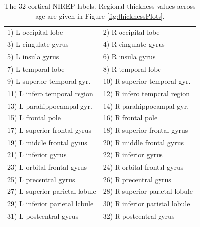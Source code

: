 \begin{table}
\centering
\begin{tabular*}{0.45\textwidth}{@{\extracolsep{\fill}} l l}
\toprule
  1) L occipital lobe & 2) R occipital lobe \\
  3) L cingulate gyrus & 4) R cingulate gyrus \\
  5) L insula gyrus & 6) R insula gyrus \\
  7) L temporal lobe & 8) R temporal lobe \\
  9) L superior temporal gyr. & 10) R superior temporal gyr. \\
  11) L infero temporal region & 12) R infero temporal region \\
  13) L parahippocampal gyr. & 14) R parahippocampal gyr. \\
  15) L frontal pole & 16) R frontal pole \\
  17) L superior frontal gyrus & 18) R superior frontal gyrus \\
  19) L middle frontal gyrus & 20) R middle frontal gyrus \\
  21) L inferior gyrus & 22) R inferior gyrus \\
  23) L orbital frontal gyrus & 24) R orbital frontal gyrus \\
  25) L precentral gyrus & 26) R precentral gyrus \\
  27) L superior parietal lobule & 28) R superior parietal lobule \\
  29) L inferior parietal lobule & 30) R inferior parietal lobule \\
  31) L postcentral gyrus & 32)   R postcentral gyrus \\  
\bottomrule
\end{tabular*}
\caption{The 32 cortical NIREP labels.  Regional thickness values across 
age are given in Figure \ref{fig:thicknessPlots}.}
\label{table:nirep_labels}
\end{table}


